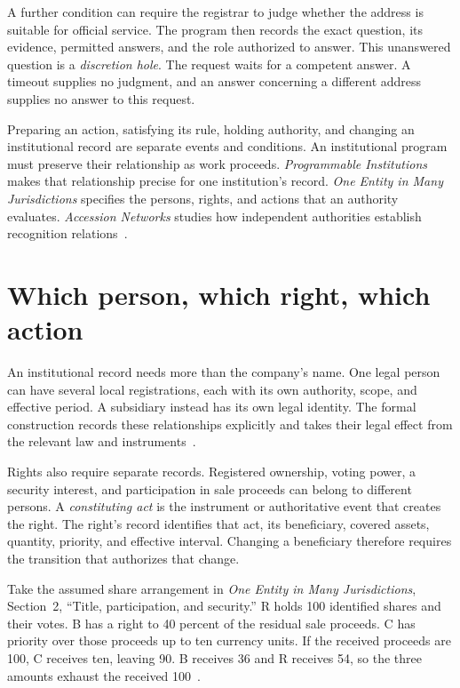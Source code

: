\documentclass{momentum}
\begin{document}
A further condition can require the registrar to judge whether the address is suitable for official service.
The program then records the exact question, its evidence, permitted answers, and the role authorized to answer.
This unanswered question is a \emph{discretion hole}.
The request waits for a competent answer.
A timeout supplies no judgment, and an answer concerning a different address supplies no answer to this request.

Preparing an action, satisfying its rule, holding authority, and changing an institutional record are separate events and conditions.
An institutional program must preserve their relationship as work proceeds.
\emph{Programmable Institutions} makes that relationship precise for one institution's record.
\emph{One Entity in Many Jurisdictions} specifies the persons, rights, and actions that an authority evaluates.
\emph{Accession Networks} studies how independent authorities establish recognition relations~\cite[Sections~2--4]{institutions}\cite[Section~2]{entity}\cite[Sections~2, 4]{accession}.

\section{Which person, which right, which action}
\label{sec:rights}

An institutional record needs more than the company's name.
One legal person can have several local registrations, each with its own authority, scope, and effective period.
A subsidiary instead has its own legal identity.
The formal construction records these relationships explicitly and takes their legal effect from the relevant law and instruments~\cite[Section~2]{entity}.

Rights also require separate records.
Registered ownership, voting power, a security interest, and participation in sale proceeds can belong to different persons.
A \emph{constituting act} is the instrument or authoritative event that creates the right.
The right's record identifies that act, its beneficiary, covered assets, quantity, priority, and effective interval.
Changing a beneficiary therefore requires the transition that authorizes that change.

Take the assumed share arrangement in \emph{One Entity in Many Jurisdictions}, Section~2, ``Title, participation, and security.''
R holds 100 identified shares and their votes.
B has a right to 40 percent of the residual sale proceeds.
C has priority over those proceeds up to ten currency units.
If the received proceeds are 100, C receives ten, leaving 90.
B receives 36 and R receives 54, so the three amounts exhaust the received 100~\cite[Section~2]{entity}.
\end{document}

